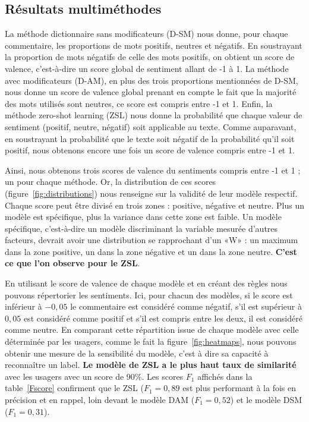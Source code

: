 \documentclass[a4paper,12pt]{report}
\begin{document}
\subsection{Résultats multiméthodes}
La méthode dictionnaire sans modificateurs (D-SM) nous donne, pour chaque commentaire, les proportions de mots positifs, neutres et négatifs. En soustrayant la proportion de mots négatifs de celle des mots positifs, on obtient un score de valence, c'est-à-dire un score global de sentiment allant de -1 à 1. La méthode avec modificateurs (D-AM), en plus des trois proportions mentionnées de D-SM, nous donne un score de valence global prenant en compte le fait que la majorité des mots utilisés sont neutres, ce score est compris entre -1 et 1. Enfin, la méthode zero-shot learning (ZSL) nous donne la probabilité que chaque valeur de sentiment (positif, neutre, négatif) soit applicable au texte. Comme auparavant, en soustrayant la probabilité que le texte soit négatif de la probabilité qu'il soit positif, nous obtenons encore une fois un score de valence compris entre -1 et 1. \par

Ainsi, nous obtenons trois scores de valence du sentiments compris entre -1 et 1 ; un pour chaque méthode. Or, la distribution de ces scores (figure~\ref{fig:distributions}) nous renseigne sur la validité de leur modèle respectif. Chaque score peut être divisé en trois zones : positive, négative et neutre. Plus un modèle est spécifique, plus la variance dans cette zone est faible. Un modèle spécifique, c'est-à-dire un modèle discriminant la variable mesurée d'autres facteurs, devrait avoir une distribution se rapprochant d'un «\;W\;» : un maximum dans la zone positive, un dans la zone négative et un dans la zone neutre. \textbf{C'est ce que l'on observe pour le ZSL}. \par

En utilisant le score de valence de chaque modèle et en créant des règles nous pouvons répertorier les sentiments. Ici, pour chacun des modèles, si le score est inférieur à $-0,05$ le commentaire est considéré comme négatif, s'il est supérieur à $0,05$ est considéré comme positif et s'il est compris entre les deux, il est considéré comme neutre. En comparant cette répartition issue de chaque modèle avec celle déterminée par les usagers, comme le fait la figure~\ref{fig:heatmaps}, nous pouvons obtenir une mesure de la sensibilité du modèle, c'est à dire sa capacité à reconnaître un label. \textbf{Le modèle de ZSL a le plus haut taux de similarité} avec les usagers avec un score de 90\%. Les scores $F_1$ affichés dans la table~\ref{Fscore} confirment que le ZSL ($F_1 = 0,89$ est plus performant à la fois en précision et en rappel, loin devant le modèle DAM ($F_1 = 0,52$) et le modèle DSM ($F_1 = 0,31$). 
\par 
\end{document}
